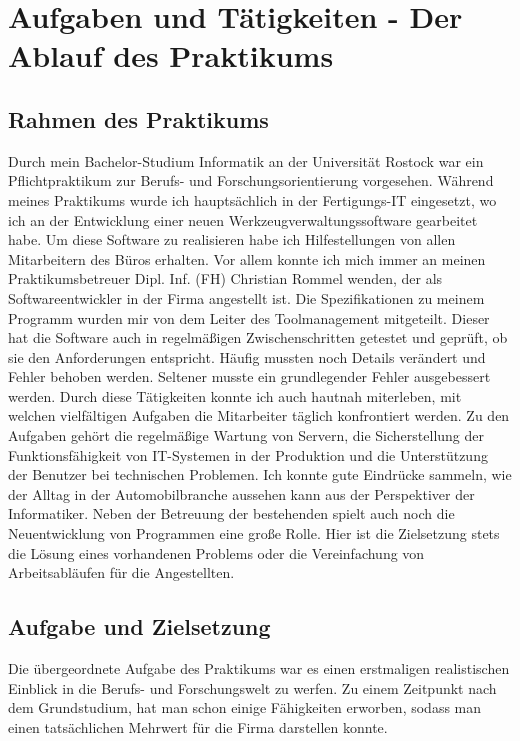\documentclass{Vorlage}
\begin{document}
\newpage

\section{Aufgaben und Tätigkeiten - Der Ablauf des Praktikums}

\renewcommand{\thesection}{\arabic{section}}

\subsection{Rahmen des Praktikums}

Durch mein Bachelor-Studium Informatik an der Universität Rostock war ein Pflichtpraktikum zur Berufs- und 
Forschungsorientierung vorgesehen.
Während meines Praktikums wurde ich 
hauptsächlich in der Fertigungs-IT eingesetzt, wo ich an der Entwicklung einer neuen 
Werkzeugverwaltungssoftware gearbeitet habe.
Um diese Software zu realisieren habe ich Hilfestellungen von allen Mitarbeitern 
des Büros erhalten. Vor allem konnte ich mich immer an
meinen Praktikumsbetreuer Dipl. Inf. (FH) Christian Rommel wenden, der als Softwareentwickler 
in der Firma angestellt ist. Die Spezifikationen zu meinem Programm
wurden mir von dem Leiter des Toolmanagement mitgeteilt. 
Dieser hat die Software auch in regelmäßigen Zwischenschritten getestet und geprüft, ob sie den Anforderungen 
entspricht.
Häufig mussten noch Details verändert und Fehler behoben werden. 
Seltener musste ein grundlegender Fehler ausgebessert werden.
Durch diese Tätigkeiten konnte ich auch hautnah miterleben, mit welchen vielfältigen Aufgaben 
die Mitarbeiter täglich konfrontiert werden. 
Zu den Aufgaben gehört die regelmäßige Wartung von Servern, die Sicherstellung der Funktionsfähigkeit 
von IT-Systemen in der Produktion und die Unterstützung der Benutzer bei technischen Problemen. 
Ich konnte gute Eindrücke sammeln, wie der Alltag
in der Automobilbranche aussehen kann aus der Perspektiver der Informatiker. 
Neben der Betreuung der bestehenden spielt auch noch die Neuentwicklung von 
Programmen eine große Rolle. Hier ist die Zielsetzung stets die Lösung eines 
vorhandenen Problems oder die Vereinfachung von Arbeitsabläufen für die 
Angestellten.

\subsection{Aufgabe und Zielsetzung}

Die übergeordnete Aufgabe des Praktikums war es einen 
erstmaligen realistischen Einblick in die Berufs- und Forschungswelt zu werfen. 
Zu einem Zeitpunkt nach dem Grundstudium, hat man schon einige Fähigkeiten 
erworben, sodass man einen tatsächlichen Mehrwert für die Firma darstellen konnte.
\end{document}
